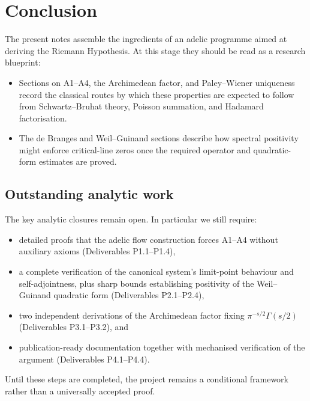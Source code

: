 \section{Conclusion}

The present notes assemble the ingredients of an adelic programme aimed at
deriving the Riemann Hypothesis.  At this stage they should be read as a
research blueprint:
\begin{itemize}
    \item Sections on A1--A4, the Archimedean factor, and Paley--Wiener
    uniqueness record the classical routes by which these properties are
    expected to follow from Schwartz--Bruhat theory, Poisson summation, and
    Hadamard factorisation.
    \item The de Branges and Weil--Guinand sections describe how spectral
    positivity might enforce critical-line zeros once the required operator and
    quadratic-form estimates are proved.
\end{itemize}

\subsection*{Outstanding analytic work}
The key analytic closures remain open.  In particular we still require:
\begin{itemize}
    \item detailed proofs that the adelic flow construction forces A1--A4
    without auxiliary axioms (Deliverables P1.1--P1.4),
    \item a complete verification of the canonical system's limit-point
    behaviour and self-adjointness, plus sharp bounds establishing positivity of
    the Weil--Guinand quadratic form (Deliverables P2.1--P2.4),
    \item two independent derivations of the Archimedean factor fixing
    $\pi^{-s/2}\Gamma(s/2)$ (Deliverables P3.1--P3.2), and
    \item publication-ready documentation together with mechanised verification
    of the argument (Deliverables P4.1--P4.4).
\end{itemize}

Until these steps are completed, the project remains a conditional framework
rather than a universally accepted proof.
